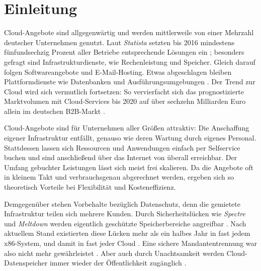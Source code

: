 \chapter{Einleitung}

Cloud-Angebote sind allgegenwärtig und werden mittlerweile von einer Mehrzahl deutscher Unternehmen genutzt. Laut \emph{Statista} setzten bis 2016 mindestens fünfundsechzig Prozent aller Betriebe entsprechende Lösungen ein \cite{bitkom:2017:cloud-nutzung-unternehmen};
besonders gefragt sind Infrastrukturdienste, wie Rechenleistung und Speicher. Gleich darauf folgen Softwareangebote und E-Mail-Hosting. Etwas abgeschlagen bleiben Plattformdienste wie Datenbanken und Ausführungsumgebungen \cite{destatis:2016:cloud-nutzung-unternehmen-einsatzzweck}. %
Der Trend zur Cloud wird sich vermutlich fortsetzen: So vervierfacht sich das prognostizierte Marktvolumen mit Cloud-Services bis 2020 auf über sechzehn Milliarden Euro allein im deutschen B2B-Markt \cite{isg:2017:cloud-ausgaben-2020}. %

Cloud-Angebote sind für Unternehmen aller Größen attraktiv: Die Anschaffung eigener Infrastruktur entfällt, genauso wie deren Wartung durch eigenes Personal. Stattdessen lassen sich Ressourcen und Anwendungen einfach per Selfservice buchen und sind anschließend über das Internet von überall erreichbar. Der Umfang gebuchter Leistungen lässt sich meist frei skalieren. Da die Angebote oft in kleinem Takt und verbrauchsgenau abgerechnet werden, ergeben sich so theoretisch Vorteile bei Flexibilität und Kosteneffizienz.

Demgegenüber stehen Vorbehalte bezüglich Datenschutz, denn die gemietete Infrastruktur teilen sich mehrere Kunden. Durch Sicherheitslücken wie \emph{Spectre} und \emph{Meltdown} werden eigentlich geschützte Speicherbereiche angreifbar \cite{Kocher2018spectre, Lipp2018meltdown}. Nach aktuellem Stand existierten diese Lücken mehr als ein halbes Jahr in fast jedem x86-System, und damit in fast jeder Cloud \cite{techcrunch:2018:spectre-meltdown-tier-2-cloud-vendors}. Eine sichere Mandantentrennung war also nicht mehr gewährleistet \cite{aws:2018:security-bulletin}. 
Aber auch durch Unachtsamkeit werden Cloud-Datenspeicher immer wieder der Öffentlichkeit zugänglich \cite{upguard:2017:breach-alteryx, upguard:2017:breach-centcom, kromtech:2018:breach-fedex}.

